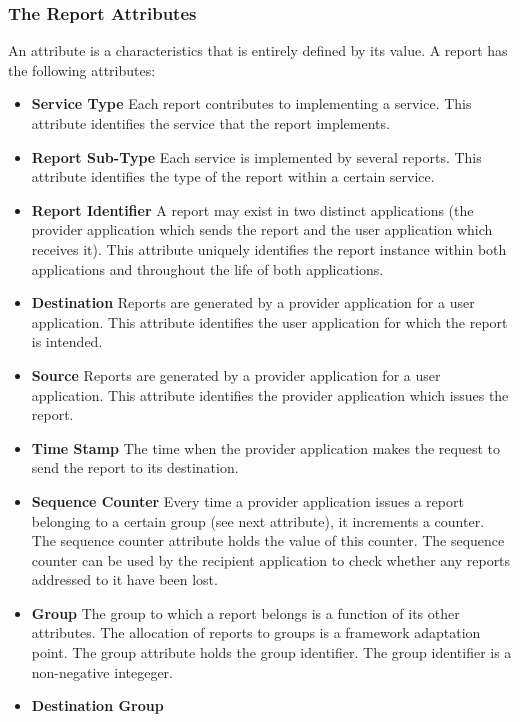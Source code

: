 \subsubsection{The Report Attributes}\label{sec:RepAttributes}

An attribute is a characteristics that is entirely defined by its value. A report has the following attributes:

\begin{itemize}
\item \textbf{Service Type}
Each report contributes to implementing a service. This attribute identifies the service that the report implements. 
\item \textbf{Report Sub-Type}
Each service is implemented by several reports. This attribute identifies the type of the report within a certain service. 
\item \textbf{Report Identifier}
A report may exist in two distinct applications (the provider application which sends the report and the user application which receives it). This attribute uniquely identifies the report instance within both applications and throughout the life of both applications.
\item \textbf{Destination}
Reports are generated by a provider application for a user application. This attribute identifies the user application for which the report is intended.
\item \textbf{Source}
Reports are generated by a provider application for a user application. This attribute identifies the provider application which issues the report.
\item \textbf{Time Stamp}
The time when the provider application makes the request to send the report to its destination.
\item \textbf{Sequence Counter}
Every time a provider application issues a report belonging to a certain group (see next attribute), it increments a counter. The sequence counter attribute holds the value of this counter. The sequence counter can be used by the recipient application to check whether any reports addressed to it have been lost. 
\item \textbf{Group}
The group to which a report belongs is a function of its other attributes. The allocation of reports to groups is a framework adaptation point. The group attribute holds the group identifier. The group identifier is a non-negative integeger.
\item \textbf{Destination Group}

\end{itemize}
